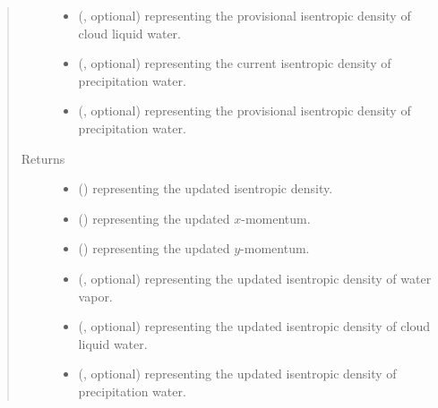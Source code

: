 \documentclass[letterpaper,10pt,english]{sphinxmanual}
\begin{document}
\begin{fulllineitems}
\begin{fulllineitems}
\begin{quote}
\begin{description}
\begin{itemize}
\item {} 
 (, optional) \textendash{}  representing the provisional isentropic density of cloud liquid water.

\item {} 
 (, optional) \textendash{}  representing the current isentropic density of precipitation water.

\item {} 
 (, optional) \textendash{}  representing the provisional isentropic density of precipitation water.

\end{itemize}

\item[{Returns}] \leavevmode
\begin{itemize}
\item {} 
 () \textendash{}  representing the updated isentropic density.

\item {} 
 () \textendash{}  representing the updated \(x\)-momentum.

\item {} 
 () \textendash{}  representing the updated \(y\)-momentum.

\item {} 
 (, optional) \textendash{}  representing the updated isentropic density of water vapor.

\item {} 
 (, optional) \textendash{}  representing the updated isentropic density of cloud liquid water.

\item {} 
 (, optional) \textendash{}  representing the updated isentropic density of precipitation water.

\end{itemize}



\end{description}
\end{quote}
\end{fulllineitems}
\end{fulllineitems}
\end{document}
